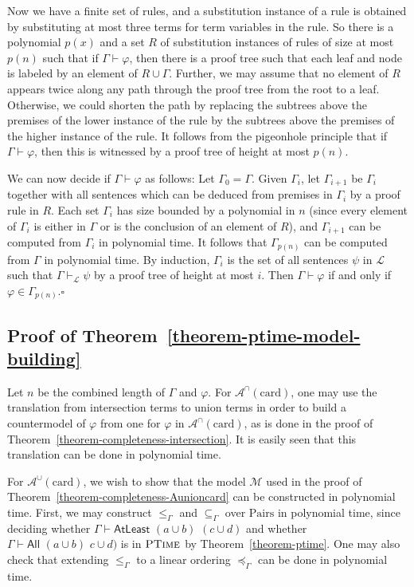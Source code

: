 \documentclass[letterpaper]{article} %
\theoremstyle{definition}
\newcommand{\Model}{\mathcal{M}}
\newcommand{\proves}{\vdash}
\newcommand{\Aunion}{\mathscr{A}^{\cup}}
\newcommand{\Ainter}{\mathscr{A}^{\cap}}
\newcommand{\Ptime}{\textsc{PTime}}
\newcommand{\All}[2]{\mathsf{All}\,\,#1\,\,#2}
\newcommand{\Atleast}[2]{\mathsf{AtLeast}\,\,#1\,\,#2}
\newcommand{\card}{\mathrm{card}}
\newcommand{\Pairs}{\mbox{Pairs}}
\newcommand{\provsub}{\subseteq_{\Gamma}}
\newcommand{\provle}{\le_{\Gamma}}
\newcommand{\provextended}{\preceq_{\Gamma}}
\begin{document}
Now we have a finite set of rules, and a substitution instance of a rule is obtained by substituting at most three terms for term variables in the rule. So there is a polynomial $p(x)$ and a set $R$ of substitution instances of rules of size at most $p(n)$ such that if $\Gamma\vdash \varphi$, then there is a proof tree such that each leaf and node is labeled by an element of $R\cup \Gamma$. Further, we may assume that no element of $R$ appears twice along any path through the proof tree from the root to a leaf. Otherwise, we could shorten the path by replacing the subtrees above the premises of the lower instance of the rule by the subtrees above the premises of the higher instance of the rule. It follows from the pigeonhole principle that if $\Gamma\vdash \varphi$, then this is witnessed by a proof tree of height at most $p(n)$. 

We can now decide if $\Gamma\vdash \varphi$ as follows: Let $\Gamma_0 = \Gamma$. Given $\Gamma_i$, let $\Gamma_{i+1}$ be $\Gamma_i$ together with all sentences which can be deduced from premises in $\Gamma_i$ by a proof rule in $R$. Each set $\Gamma_i$ has size bounded by a polynomial in $n$ (since every element of $\Gamma_i$ is either in $\Gamma$ or is the conclusion of an element of $R$), and $\Gamma_{i+1}$ can be computed from $\Gamma_i$ in polynomial time. It follows that $\Gamma_{p(n)}$ can be computed from $\Gamma$ in polynomial time. By induction, $\Gamma_i$ is the set of all sentences $\psi$ in $\mathcal{L}$ such that $\Gamma\vdash_{\mathcal{L}} \psi$ by a proof tree of height at most $i$. Then $\Gamma\vdash \varphi$ if and only if $\varphi\in \Gamma_{p(n)}$.\hfill$\square$


\subsection*{Proof of Theorem~\ref{theorem-ptime-model-building}}

Let $n$ be the combined length of $\Gamma$ and $\varphi$. For $\Ainter(\card)$, one may use the translation from intersection terms to union terms in order to build a countermodel of $\varphi$ from one for $\varphi$ in $\Ainter(\card)$, as is done in the proof of Theorem~\ref{theorem-completeness-intersection}.  It is easily seen that this translation can be done in polynomial time.

For $\Aunion(\card)$, we wish to show that the model $\Model$ used in the proof of Theorem~\ref{theorem-completeness-Aunioncard} can be constructed in polynomial time.  First, we may construct $\provle$ and $\provsub$ over $\Pairs$ in polynomial time, since deciding whether $\Gamma \proves \Atleast{(a \cup b)}{(c \cup d)}$ and whether $\Gamma \proves \All{(a \cup b)}{c \cup d)}$ is in $\Ptime$ by Theorem~\ref{theorem-ptime}.  One may also check that extending $\provle$ to a linear ordering $\provextended$ can be done in polynomial time.
\end{document}
